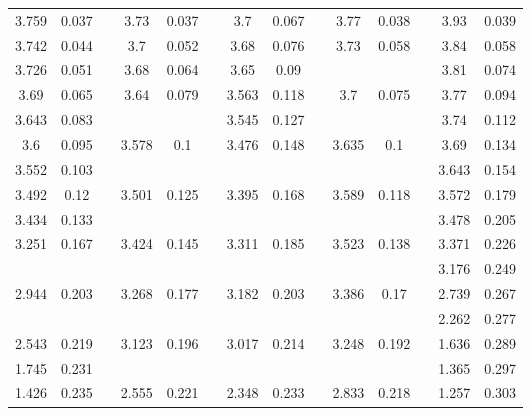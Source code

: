\documentclass[%
 aip,
 amsmath,amssymb,
 reprint, floatfix%
]{revtex4-2}
\begin{document}
\begin{table}[]
\begin{tabular}{@{}cccccccccccccc@{}}
    3.759 & 0.037 &  & 3.73 & 0.037 &  & 3.7 & 0.067 &  & 3.77 & 0.038 &  & 3.93 & 0.039 \\
    3.742 & 0.044 &  & 3.7 & 0.052 &  & 3.68 & 0.076 &  & \multirow{2}{*}{3.73} & \multirow{2}{*}{0.058} &  & 3.84 & 0.058 \\
    3.726 & 0.051 &  & 3.68 & 0.064 &  & 3.65 & 0.09 &  &  &  &  & 3.81 & 0.074 \\
    3.69 & 0.065 &  & \multirow{2}{*}{3.64} & \multirow{2}{*}{0.079} &  & 3.563 & 0.118 &  & \multirow{2}{*}{3.7} & \multirow{2}{*}{0.075} &  & 3.77 & 0.094 \\
    3.643 & 0.083 &  &  &  &  & 3.545 & 0.127 &  &  &  &  & 3.74 & 0.112 \\
    3.6 & 0.095 &  & \multirow{2}{*}{3.578} & \multirow{2}{*}{0.1} &  & \multirow{2}{*}{3.476} & \multirow{2}{*}{0.148} &  & \multirow{2}{*}{3.635} & \multirow{2}{*}{0.1} &  & 3.69 & 0.134 \\
    3.552 & 0.103 &  &  &  &  &  &  &  &  &  &  & 3.643 & 0.154 \\
    3.492 & 0.12 &  & \multirow{2}{*}{3.501} & \multirow{2}{*}{0.125} &  & \multirow{2}{*}{3.395} & \multirow{2}{*}{0.168} &  & \multirow{2}{*}{3.589} & \multirow{2}{*}{0.118} &  & 3.572 & 0.179 \\
    3.434 & 0.133 &  &  &  &  &  &  &  &  &  &  & 3.478 & 0.205 \\
    \multirow{2}{*}{3.251} & \multirow{2}{*}{0.167} &  & \multirow{2}{*}{3.424} & \multirow{2}{*}{0.145} &  & \multirow{2}{*}{3.311} & \multirow{2}{*}{0.185} &  & \multirow{2}{*}{3.523} & \multirow{2}{*}{0.138} &  & 3.371 & 0.226 \\
     &  &  &  &  &  &  &  &  &  &  &  & 3.176 & 0.249 \\
    \multirow{2}{*}{2.944} & \multirow{2}{*}{0.203} &  & \multirow{2}{*}{3.268} & \multirow{2}{*}{0.177} &  & \multirow{2}{*}{3.182} & \multirow{2}{*}{0.203} &  & \multirow{2}{*}{3.386} & \multirow{2}{*}{0.17} &  & 2.739 & 0.267 \\
     &  &  &  &  &  &  &  &  &  &  &  & 2.262 & 0.277 \\
    2.543 & 0.219 &  & \multirow{2}{*}{3.123} & \multirow{2}{*}{0.196} &  & \multirow{2}{*}{3.017} & \multirow{2}{*}{0.214} &  & \multirow{2}{*}{3.248} & \multirow{2}{*}{0.192} &  & 1.636 & 0.289 \\
    1.745 & 0.231 &  &  &  &  &  &  &  &  &  &  & 1.365 & 0.297 \\
    1.426 & 0.235 &  & \multirow{2}{*}{2.555} & \multirow{2}{*}{0.221} &  & \multirow{2}{*}{2.348} & \multirow{2}{*}{0.233} &  & \multirow{2}{*}{2.833} & \multirow{2}{*}{0.218} &  & 1.257 & 0.303 \\

\end{tabular}
\end{table}
\end{document}
